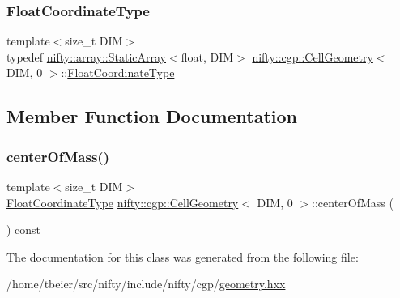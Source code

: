\mbox{\label{classnifty_1_1cgp_1_1CellGeometry_3_01DIM_00_010_01_4_a825cfc0d2e082ccd4b34e5ab2046dbe6}} 
\subsubsection{\texorpdfstring{Float\+Coordinate\+Type}{FloatCoordinateType}}
{\footnotesize\ttfamily template$<$size\+\_\+t D\+IM$>$ \\
typedef \hyperlink{namespacenifty_1_1array_a683f151f19c851754e0c6d55ed16a0c2}{nifty\+::array\+::\+Static\+Array}$<$float, D\+IM$>$ \hyperlink{classnifty_1_1cgp_1_1CellGeometry}{nifty\+::cgp\+::\+Cell\+Geometry}$<$ D\+IM, 0 $>$\+::\hyperlink{classnifty_1_1cgp_1_1CellGeometry_3_01DIM_00_010_01_4_a825cfc0d2e082ccd4b34e5ab2046dbe6}{Float\+Coordinate\+Type}}



\subsection{Member Function Documentation}
\mbox{\label{classnifty_1_1cgp_1_1CellGeometry_3_01DIM_00_010_01_4_a5e690a9e80174e40c03b74a2804dd0a8}} 
\subsubsection{\texorpdfstring{center\+Of\+Mass()}{centerOfMass()}}
{\footnotesize\ttfamily template$<$size\+\_\+t D\+IM$>$ \\
\hyperlink{classnifty_1_1cgp_1_1CellGeometry_3_01DIM_00_010_01_4_a825cfc0d2e082ccd4b34e5ab2046dbe6}{Float\+Coordinate\+Type} \hyperlink{classnifty_1_1cgp_1_1CellGeometry}{nifty\+::cgp\+::\+Cell\+Geometry}$<$ D\+IM, 0 $>$\+::center\+Of\+Mass (\begin{DoxyParamCaption}{ }\end{DoxyParamCaption}) const\hspace{0.3cm}{\ttfamily [inline]}}



The documentation for this class was generated from the following file\+:\begin{DoxyCompactItemize}
\item 
/home/tbeier/src/nifty/include/nifty/cgp/\hyperlink{geometry_8hxx}{geometry.\+hxx}\end{DoxyCompactItemize}
